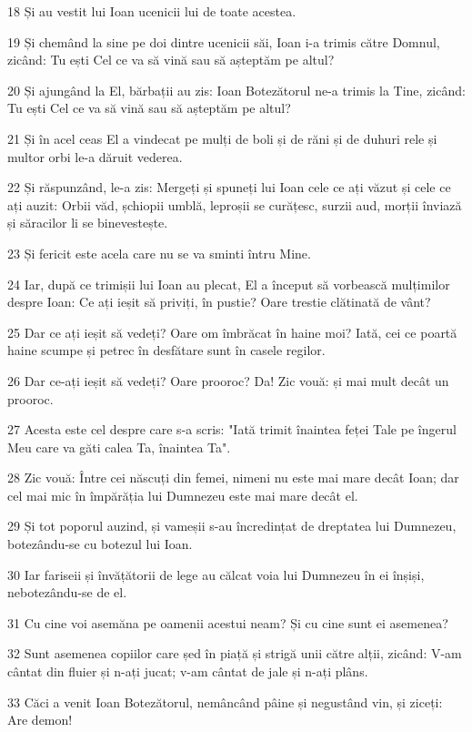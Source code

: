\par 18 Și au vestit lui Ioan ucenicii lui de toate acestea.
\par 19 Și chemând la sine pe doi dintre ucenicii săi, Ioan i-a trimis către Domnul, zicând: Tu ești Cel ce va să vină sau să așteptăm pe altul?
\par 20 Și ajungând la El, bărbații au zis: Ioan Botezătorul ne-a trimis la Tine, zicând: Tu ești Cel ce va să vină sau să așteptăm pe altul?
\par 21 Și în acel ceas El a vindecat pe mulți de boli și de răni și de duhuri rele și multor orbi le-a dăruit vederea.
\par 22 Și răspunzând, le-a zis: Mergeți și spuneți lui Ioan cele ce ați văzut și cele ce ați auzit: Orbii văd, șchiopii umblă, leproșii se curățesc, surzii aud, morții înviază și săracilor li se binevestește.
\par 23 Și fericit este acela care nu se va sminti întru Mine.
\par 24 Iar, după ce trimișii lui Ioan au plecat, El a început să vorbească mulțimilor despre Ioan: Ce ați ieșit să priviți, în pustie? Oare trestie clătinată de vânt?
\par 25 Dar ce ați ieșit să vedeți? Oare om îmbrăcat în haine moi? Iată, cei ce poartă haine scumpe și petrec în desfătare sunt în casele regilor.
\par 26 Dar ce-ați ieșit să vedeți? Oare prooroc? Da! Zic vouă: și mai mult decât un prooroc.
\par 27 Acesta este cel despre care s-a scris: "Iată trimit înaintea feței Tale pe îngerul Meu care va găti calea Ta, înaintea Ta".
\par 28 Zic vouă: Între cei născuți din femei, nimeni nu este mai mare decât Ioan; dar cel mai mic în împărăția lui Dumnezeu este mai mare decât el.
\par 29 Și tot poporul auzind, și vameșii s-au încredințat de dreptatea lui Dumnezeu, botezându-se cu botezul lui Ioan.
\par 30 Iar fariseii și învățătorii de lege au călcat voia lui Dumnezeu în ei înșiși, nebotezându-se de el.
\par 31 Cu cine voi asemăna pe oamenii acestui neam? Și cu cine sunt ei asemenea?
\par 32 Sunt asemenea copiilor care șed în piață și strigă unii către alții, zicând: V-am cântat din fluier și n-ați jucat; v-am cântat de jale și n-ați plâns.
\par 33 Căci a venit Ioan Botezătorul, nemâncând pâine și negustând vin, și ziceți: Are demon!
